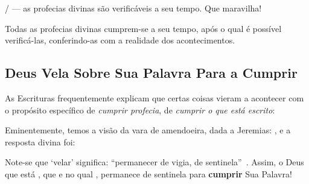  
     /  --- as profecias divinas são  verificáveis  a  seu  tempo.  Que
    maravilha!

    \begin{DEF}
        \label{def.pri.verificabilidade}
        Todas as profecias divinas cumprem-se a seu tempo, após o qual é possível verificá-las, conferindo-as com  a
        realidade dos acontecimentos.
    \end{DEF}


    \subsection{Deus Vela Sobre Sua Palavra Para a Cumprir}

    As Escrituras frequentemente explicam que certas coisas vieram a acontecer  com  o  propósito  específico  de  \emph{cumprir
    profecia}, de \emph{cumprir o que está escrito}:


    Eminentemente, temos a visão da vara de amendoeira, dada a Jeremias: , e a resposta divina foi:


    Note-se que `velar' significa: ``permanecer de vigia, de sentinela''~\cite{2009-Houaiss+Franco-Objetiva}. Assim, o Deus  que
    está ,  que   e no qual , permanece de sentinela para \textbf{cumprir} Sua Palavra!

